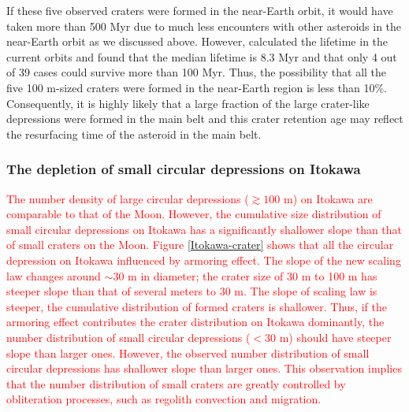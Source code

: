 \documentclass[3p,authoryear]{elsarticle}
\newcommand{\red}[1]{\textcolor{red}{#1}}
\begin{document}
If these five observed craters were formed in the near-Earth orbit, it would have taken more than 500 Myr due to much less encounters with other asteroids in the near-Earth orbit as we discussed above.
However, \citet{michel2005} calculated the lifetime in the current orbits and found that the median lifetime is 8.3 Myr and that only 4 out of 39 cases could survive more than 100 Myr.
Thus, the possibility that all the five 100 m-sized craters were formed in the near-Earth region is less than 10\%.
Consequently, it is highly likely that a large fraction of the large crater-like depressions were formed in the main belt and this crater retention age may reflect the resurfacing  time of the asteroid in the main belt.
\begin{comment}
This has an important implication for resurfacing on Itokawa in its near-Earth orbit.
Although many NEAs, such as Q-type asteroids, may experienced major resurfacing presumably due to tidal force upon close encounters to terrestrial planets ({binzel2010}), Itokawa probably did not experience such extensive resurfacing after it entered its near-Earth orbit.
Otherwise, its crater retention age would be much younger.
\end{comment}

 \subsubsection{The depletion of small circular depressions on Itokawa}
\red{The number density of large circular depressions ($\gtrsim 100$ m) on Itokawa are comparable to that of the Moon.
However, the cumulative size distribution of small circular depressions on Itokawa has a significantly shallower slope than that of small craters on the Moon.
Figure \ref{Itokawa-crater} shows that all the circular depression on Itokawa influenced by armoring effect.
The slope of the new scaling law changes around $\sim 30$ m in diameter; the crater size of 30 m to 100 m has steeper slope than that of several meters to 30 m.
The slope of scaling law is steeper, the cumulative distribution of formed craters is shallower. 
Thus, if the armoring effect contributes the crater distribution on Itokawa dominantly, the number distribution of small circular depressions ($< 30$ m) should have steeper slope than larger ones.
However, the observed number distribution of small circular depressions has shallower slope than larger ones.
This observation implies that the number distribution of small craters are greatly controlled by obliteration processes, such as regolith convection and migration.
}
\end{document}
